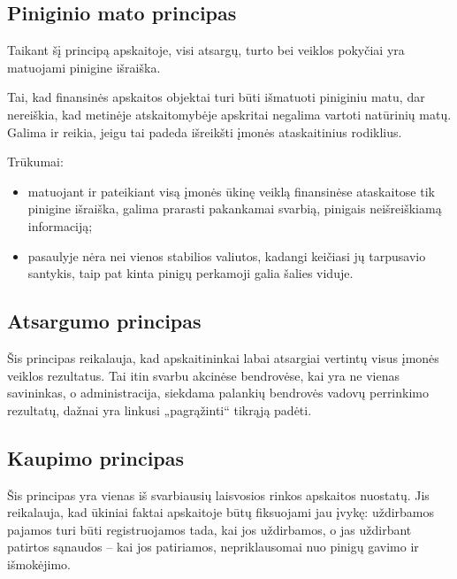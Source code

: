 \subsection{Piniginio mato principas}


Taikant šį principą apskaitoje, visi atsargų, turto bei veiklos pokyčiai
yra matuojami pinigine išraiška.

Tai, kad finansinės apskaitos objektai turi būti išmatuoti piniginiu
matu, dar nereiškia, kad metinėje atskaitomybėje apskritai negalima
vartoti natūrinių matų. Galima ir reikia, jeigu tai padeda išreikšti
įmonės ataskaitinius rodiklius.


Trūkumai:
\begin{itemize}
  \item matuojant ir pateikiant visą įmonės ūkinę veiklą finansinėse
    ataskaitose tik pinigine išraiška, galima prarasti pakankamai
    svarbią, pinigais neišreiškiamą informaciją;
  \item pasaulyje nėra nei vienos stabilios valiutos, kadangi keičiasi
    jų tarpusavio santykis, taip pat kinta pinigų perkamoji galia
    šalies viduje.
\end{itemize}

\subsection{Atsargumo principas}


Šis principas reikalauja, kad apskaitininkai labai atsargiai vertintų
visus įmonės veiklos rezultatus. Tai itin svarbu akcinėse bendrovėse,
kai yra ne vienas savininkas, o administracija, siekdama palankių
bendrovės vadovų perrinkimo rezultatų, dažnai yra linkusi „pagrąžinti“
tikrąją padėti.

\subsection{Kaupimo principas}


Šis principas yra vienas iš svarbiausių laisvosios rinkos apskaitos
nuostatų. Jis reikalauja, kad ūkiniai faktai apskaitoje būtų fiksuojami
jau įvykę: uždirbamos pajamos turi būti registruojamos tada, kai 
jos uždirbamos, o jas uždirbant patirtos sąnaudos – kai jos patiriamos,
nepriklausomai nuo pinigų gavimo ir išmokėjimo.

